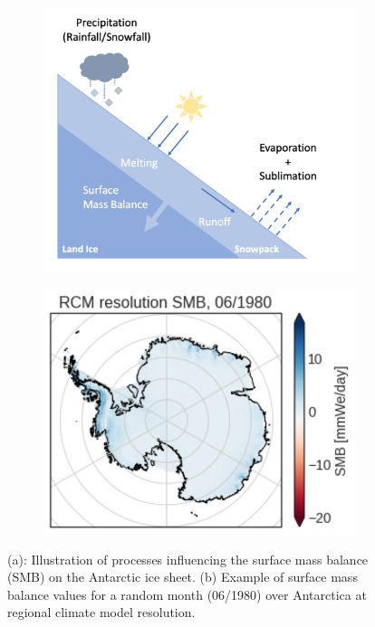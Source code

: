 \documentclass[a4paper,11pt,oneside]{report}
\begin{document}
\begin{itemize}
    
    \begin{figure}[tbp]
        \centering
        \begin{subfigure}[b]{0.45\columnwidth}  
            \centering 
            \includegraphics[width=\textwidth]{doc/Thesis-latex/images/processes_smb.pdf}
            \caption[]%
            {{\small }} \label{fig:smb-processes}
        \end{subfigure}
        \hfill
        \begin{subfigure}[b]{0.45\columnwidth}
            \centering \includegraphics[width=\textwidth]{doc/Thesis-latex/images/smb-example.pdf}
            \caption[]%
            {{\small }}    
          \label{fig:example-smb}
        \end{subfigure}
        \caption[]
        {\small (a): Illustration of processes influencing the surface mass balance (SMB) on the Antarctic ice sheet. (b) Example of surface mass balance values for a random month (06/1980) over Antarctica at regional climate model resolution.
        } 
        \label{fig:example-smb-and-processes}
    \end{figure}
    

\end{itemize}
\end{document}
